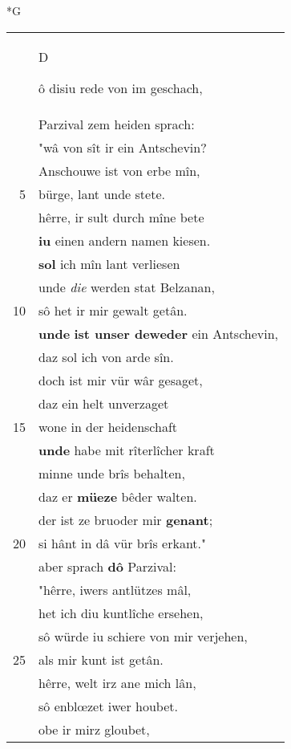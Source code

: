 \documentclass[8pt,a4paper,notitlepage]{article}
\begin{document}
\newpage
\begin{table}[ht]
\begin{minipage}[t]{0.5\linewidth}
\small
\begin{center}*G
\end{center}
\begin{tabular}{rl}
 & \begin{large}D\end{large}ô disiu rede von im geschach,\\ 
 & Parzival zem heiden sprach:\\ 
 & "wâ von sît ir ein Antschevin?\\ 
 & Anschouwe ist von erbe mîn,\\ 
5 & bürge, lant unde stete.\\ 
 & hêrre, ir sult durch mîne bete\\ 
 & \textbf{iu} einen andern namen kiesen.\\ 
 & \textbf{sol} ich mîn lant verliesen\\ 
 & unde \textit{die} werden stat Belzanan,\\ 
10 & sô het ir mir gewalt getân.\\ 
 & \textbf{unde} \textbf{ist unser deweder} ein Antschevin,\\ 
 & daz sol ich von arde sîn.\\ 
 & doch ist mir vür wâr gesaget,\\ 
 & daz ein helt unverzaget\\ 
15 & wone in der heidenschaft\\ 
 & \textbf{unde} habe mit rîterlîcher kraft\\ 
 & minne unde brîs behalten,\\ 
 & daz er \textbf{müeze} bêder walten.\\ 
 & der ist ze bruoder mir \textbf{genant};\\ 
20 & si hânt in dâ vür brîs erkant."\\ 
 & aber sprach \textbf{dô} Parzival:\\ 
 & "hêrre, iwers antlützes mâl,\\ 
 & het ich diu kuntlîche ersehen,\\ 
 & sô würde iu schiere von mir verjehen,\\ 
25 & als mir kunt ist getân.\\ 
 & hêrre, welt irz ane mich lân,\\ 
 & sô enblœzet iwer houbet.\\ 
 & obe ir mirz gloubet,\\ 

\end{tabular}
\end{minipage}
\end{table}
\end{document}
